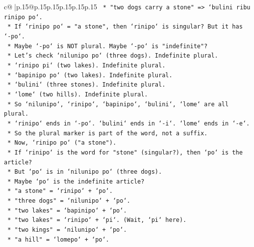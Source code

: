 \documentclass{article}
\begin{document}
{\begin{supertabular}{c@{$\;$}|p{.15\linewidth}@{}p{.15\linewidth}p{.15\linewidth}p{.15\linewidth}p{.15\linewidth}p{.15\linewidth}}
{{{\texttt{                    *   "two dogs carry a stone" => `bulini ribu rinipo po`.} \\
\texttt{                    *   If `rinipo po` = "a stone", then `rinipo` is singular? But it has `{-}po`.} \\
\texttt{                    *   Maybe `{-}po` is NOT plural. Maybe `{-}po` is "indefinite"?} \\
\texttt{                    *   Let's check `nilunipo po` (three dogs). Indefinite plural.} \\
\texttt{                    *   `rinipo pi` (two lakes). Indefinite plural.} \\
\texttt{                    *   `bapinipo po` (two lakes). Indefinite plural.} \\
\texttt{                    *   `bulini` (three stones). Indefinite plural.} \\
\texttt{                    *   `lome` (two hills). Indefinite plural.} \\
\texttt{                    *   So `nilunipo`, `rinipo`, `bapinipo`, `bulini`, `lome` are all plural.} \\
\texttt{                    *   `rinipo` ends in `{-}po`. `bulini` ends in `{-}i`. `lome` ends in `{-}e`.} \\
\texttt{                    *   So the plural marker is part of the word, not a suffix.} \\
\texttt{                    *   Now, `rinipo po` ("a stone").} \\
\texttt{                    *   If `rinipo` is the word for "stone" (singular?), then `po` is the article?} \\
\texttt{                    *   But `po` is in `nilunipo po` (three dogs).} \\
\texttt{                    *   Maybe `po` is the indefinite article?} \\
\texttt{                    *   "a stone" = `rinipo` + `po`.} \\
\texttt{                    *   "three dogs" = `nilunipo` + `po`.} \\
\texttt{                    *   "two lakes" = `bapinipo` + `po`.} \\
\texttt{                    *   "two lakes" = `rinipo` + `pi`. (Wait, `pi` here).} \\
\texttt{                    *   "two kings" = `nilunipo` + `po`.} \\
\texttt{                    *   "a hill" = `lomepo` + `po`.} \\
}}}
\end{supertabular}}
\end{document}
